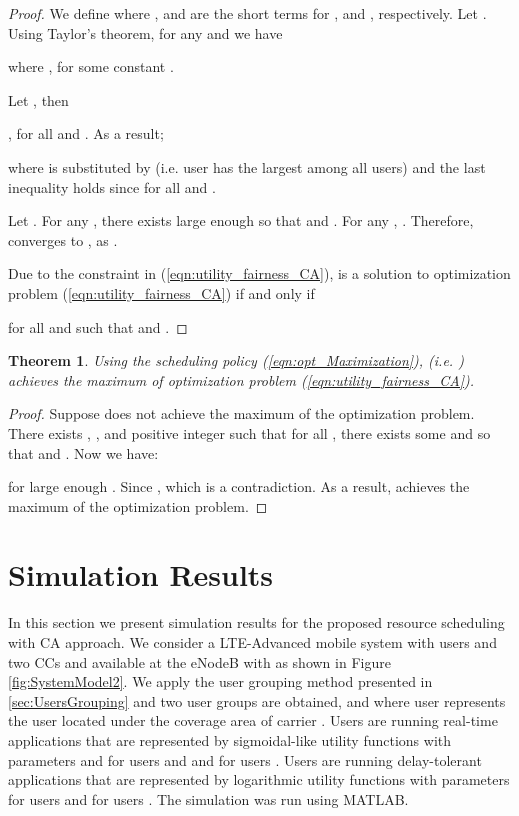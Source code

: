 \documentclass[conference]{IEEEtran}
\newtheorem{thm}{Theorem}[section]
\begin{document}
\begin{proof}
We define  where ,  and  are the short terms for ,  and , respectively. Let . Using Taylor's theorem, for any  and  we have



where , for some constant .

Let , then


, for all  and . As a result;

\vspace{-1em}

where  is substituted by  (i.e. user  has the largest  among all users) and the last inequality holds since  for all  and .

Let . For any , there exists large enough  so that  and . For any , . Therefore,  converges to , as .

Due to the constraint  in (\ref{eqn:utility_fairness_CA}),  is a solution to optimization problem (\ref{eqn:utility_fairness_CA}) if and only if
\vspace{-0.5em}

for all  and  such that  and .
\end{proof}
\vspace{-1.3em}
\begin{thm}\label{thm:limitmax}
Using the scheduling policy (\ref{eqn:opt_Maximization}),  (i.e. ) achieves the maximum of optimization problem (\ref{eqn:utility_fairness_CA}).
\end{thm}
\begin{proof}
Suppose  does not achieve the maximum of the optimization problem. There exists , , and positive integer  such that for all , there exists some  and  so that  and  . Now we have:
\vspace{-0.7em}

for large enough . Since , which is a contradiction. As a result,  achieves the maximum of the optimization problem.
\end{proof}
\vspace{-0.08in}
\section{Simulation Results}\label{sec:sim}
In this section we present simulation results for the proposed resource scheduling with CA approach. We consider a LTE-Advanced mobile system with  users and two CCs  and  available at the eNodeB with  as shown in Figure \ref{fig:SystemModel2}. We apply the user grouping method presented in \ref{sec:UsersGrouping} and two user groups are obtained,  and  where user  represents the  user located under the coverage area of carrier . Users  are running real-time applications that are represented by sigmoidal-like utility functions with parameters  and  for users  and  and  for users . Users  are running delay-tolerant applications that are represented by logarithmic utility functions with parameters  for users  and  for users . The simulation was run using MATLAB.
\end{document}
